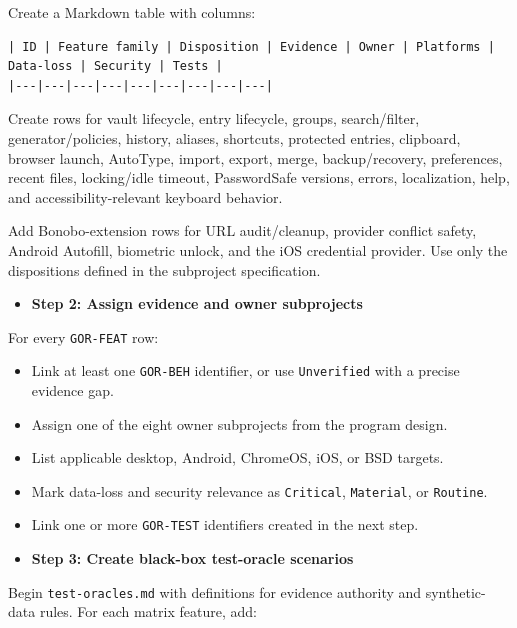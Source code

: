 \documentclass[
  letterpaper,
]{article}
\newcommand{\passthrough}[1]{#1}
\providecommand{\tightlist}{%
  \setlength{\itemsep}{0pt}\setlength{\parskip}{0pt}}
\begin{document}
Create a Markdown table with columns:

\begin{lstlisting}
| ID | Feature family | Disposition | Evidence | Owner | Platforms | Data-loss | Security | Tests |
|---|---|---|---|---|---|---|---|---|
\end{lstlisting}

Create rows for vault lifecycle, entry lifecycle, groups, search/filter, generator/policies, history, aliases,
shortcuts, protected entries, clipboard, browser launch, AutoType, import, export, merge, backup/recovery, preferences,
recent files, locking/idle timeout, PasswordSafe versions, errors, localization, help, and accessibility-relevant
keyboard behavior.

Add Bonobo-extension rows for URL audit/cleanup, provider conflict safety, Android Autofill, biometric unlock, and the
iOS credential provider. Use only the dispositions defined in the subproject specification.

\begin{itemize}
\tightlist
\item[$\boxtimes$]
  \textbf{Step 2: Assign evidence and owner subprojects}
\end{itemize}

For every \passthrough{\lstinline!GOR-FEAT!} row:

\begin{itemize}
\tightlist
\item
  Link at least one \passthrough{\lstinline!GOR-BEH!} identifier, or use \nolinkurl{Unverified} with a precise evidence
  gap.
\item
  Assign one of the eight owner subprojects from the program design.
\item
  List applicable desktop, Android, ChromeOS, iOS, or BSD targets.
\item
  Mark data-loss and security relevance as \passthrough{\lstinline!Critical!}, \passthrough{\lstinline!Material!}, or
  \passthrough{\lstinline!Routine!}.
\item
  Link one or more \passthrough{\lstinline!GOR-TEST!} identifiers created in the next step.
\end{itemize}

\begin{itemize}
\tightlist
\item[$\boxtimes$]
  \textbf{Step 3: Create black-box test-oracle scenarios}
\end{itemize}

Begin \nolinkurl{test-oracles.md} with definitions for evidence authority and synthetic-data rules. For each matrix
feature, add:
\end{document}
